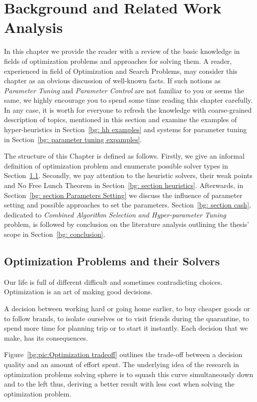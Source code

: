 \chapter{Background and Related Work Analysis}\label{bg}
In this chapter we provide the reader with a review of the basic knowledge in fields of optimization problems and approaches for solving them.
A reader, experienced in field of Optimization and Search Problems, may consider this chapter as an obvious discussion of well-known facts. 
If such notions as \textit{Parameter Tuning} and \textit{Parameter Control} are not familiar to you or seems the same, we highly encourage you to spend some time reading this chapter carefully.
In any case, it is worth for everyone to refresh the knowledge with coarse-grained description of topics, mentioned in this section and examine the examples of hyper-heuristics in Section~\ref{bg: hh examples} and systems for parameter tuning in Section~\ref{bg: parameter tuning expamples}.

The structure of this Chapter is defined as follows. Firstly, we give an informal definition of optimization problem and enumerate possible solver types in Section~\ref{bg:section problems and solvers}. Secondly, we pay attention to the heuristic solvers, their weak points and No Free Lunch Theorem in Section~\ref{bg: section heuristics}. Afterwards, in Section~\ref{bg: section Parameters Setting} we discuss the influence of parameter setting and possible approaches to set the parameters. Section~\ref{bg: section cash}, dedicated to \emph{Combined Algorithm Selection and Hyper-parameter Tuning} problem, is followed by conclusion on the literature analysis outlining the thesis' scope in Section~\ref{bg: conclusion}.

\section{Optimization Problems and their Solvers}\label{bg:section problems and solvers}
Our life is full of different difficult and sometimes contradicting choices. Optimization is an art of making good decisions.

A decision between working hard or going home earlier, to buy cheaper goods or to follow brands, to isolate ourselves or to visit friends during the quarantine, to spend more time for planning trip or to start it instantly. Each decision that we make, has its consequences.

Figure~\ref{bg:pic:Optimization tradeoff} outlines the trade-off between a decision quality and an amount of effort spent. The underlying idea of the research in optimization problems solving sphere is to squash this curve simultaneously down and to the left thus, deriving a better result with less cost when solving the optimization problem.

